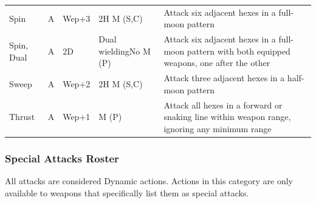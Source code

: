 \documentclass[12pt]{article}
\begin{document}
\begin{center}
\begin{tabularx}{\textwidth}{p{}p{}p{}p{}p{}}
Spin & A & Wep+3 & 2H M (S,C) & Attack six adjacent hexes in a full-moon pattern\\
Spin, Dual & A & 2D & Dual wielding\newline No M (P) & Attack six adjacent hexes in a full-moon pattern with both equipped weapons, one after the other\\
Sweep & A & Wep+2 & 2H M (S,C) & Attack three adjacent hexes in a half-moon pattern\\
Thrust & A & Wep+1 & M (P) & Attack all hexes in a forward or snaking line within weapon range, ignoring any minimum range\\
\hline
\end{tabularx}
\end{center}

\pagebreak

\subsubsection{Special Attacks Roster}
All attacks are considered Dynamic actions. Actions in this category are only available to weapons that specifically list them as special attacks.\\
\end{document}
